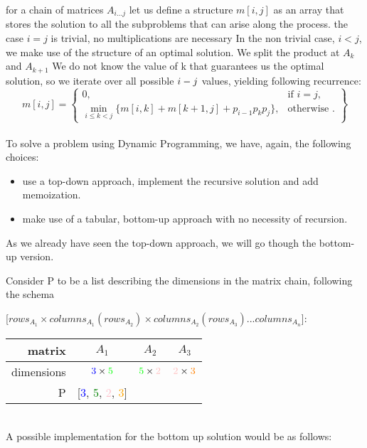 for a chain of matrices $A_{i...j}$ let us define a structure $m[i, j]$ as an array
that stores the solution to all the subproblems that can arise along the
process. the case $i = j$ is trivial, no multiplications are necessary
In the non trivial case, $i < j$, we make use of the structure of an optimal
solution. We split the product at $A_k$ and $A_{k+1}$
We do not know the value of k that guarantees us the optimal solution, so
we iterate over all possible $i\-- j$ values, yielding following recurrence:
 \\
  \[
    m[i,j] = \left\{\begin{array}{lr}
      0, & \text{if } i = j,\\
      \min_{i \leq k < j}\{m[i,k] + m[k+1, j] + p_{i-1}p_{k}p_{j}\}, & \text{otherwise }.
      \end{array}\right\}
  \]
  \\

To solve a problem using Dynamic Programming, we have, again, the following choices:

\begin{itemize}
  \item use a top-down approach, implement the recursive solution and add memoization.
  \item make use of a tabular, bottom-up approach with no necessity of recursion.
\end{itemize}

As we already have seen the top-down approach, we will go though the bottom-up version.

Consider P to be a list describing the dimensions in the matrix chain, following the schema

[$rows_{A_{1}}  \times columns_{A_{1}}(rows_{A_{2}}) \times columns_{A_{2}} (rows_{A_{3}}) ... columns_{A_{n}}$]:

 \begin{tabular}{r|ccc}
    matrix & $A_1$ & $A_2$ & $A_3$ \\
    \hline 
    dimensions & $\textcolor{blue}{3} \times \textcolor{green}{5}$ & $\textcolor{green}{5} \times \textcolor{pink}{2}$ & $\textcolor{pink}{2} \times \textcolor{orange}{3}$ \\
    P & [\textcolor{blue}{3}, \textcolor{green}{5}, \textcolor{pink}{2}, \textcolor{orange}{3}]
  \end{tabular}
\\ 

A possible implementation for the bottom up solution would be as follows:

